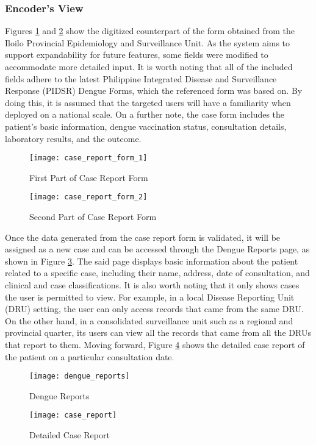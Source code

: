 \subsubsection{Encoder's View}
Figures \ref{fig:case_report_form_1} and \ref{fig:case_report_form_2} show the digitized counterpart of the form obtained from the Iloilo Provincial Epidemiology and Surveillance Unit. As the system aims to support expandability for future features, some fields were modified to accommodate more detailed input. It is worth noting that all of the included fields adhere to the latest Philippine Integrated Disease and Surveillance Response (PIDSR) Dengue Forms, which the referenced form was based on. By doing this, it is assumed that the targeted users will have a familiarity when deployed on a national scale. On a further note, the case form includes the patient's basic information, dengue vaccination status, consultation details, laboratory results, and the outcome. 
\begin{figure}[H]
	\centering
	\texttt{[image: case\_report\_form\_1]}
	\caption{First Part of Case Report Form}
	\label{fig:case_report_form_1}
\end{figure}
\begin{figure}[H]
	\centering
	\texttt{[image: case\_report\_form\_2]}
	\caption{Second Part of Case Report Form}
	\label{fig:case_report_form_2}
\end{figure}
\clearpage
Once the data generated from the case report form is validated, it will be assigned as a new case and can be accessed through the Dengue Reports page, as shown in Figure \ref{fig:dengue_reports}. The said page displays basic information about the patient related to a specific case, including their name, address, date of consultation, and clinical and case classifications. 
It is also worth noting that it only shows cases the user is permitted to view. For example, in a local Disease Reporting Unit (DRU) setting, the user can only access records that came from the same DRU. On the other hand, in a consolidated surveillance unit such as a regional and provincial quarter, its users can view all the records that came from all the DRUs that report to them. Moving forward, Figure \ref{fig:case_report} shows the detailed case report of the patient on a particular consultation date. 
\begin{figure}[H]
	\centering
	\texttt{[image: dengue\_reports]}
	\caption{Dengue Reports}
	\label{fig:dengue_reports}
\end{figure}
\begin{figure}[H]
	\centering
	\texttt{[image: case\_report]}
	\caption{Detailed Case Report}
	\label{fig:case_report}
\end{figure}
